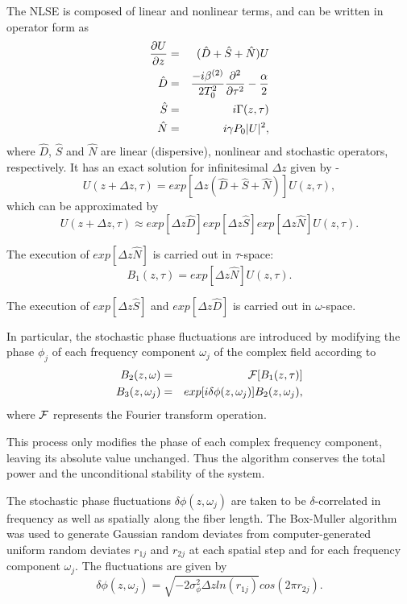 The NLSE is composed of linear and nonlinear terms, and can be written in operator form as
\begin{eqnarray}
{\partial U \over \partial z} & = & (\hat{D}+\hat{S}+\hat{N})U \nonumber \\
\hat{D}& = & {-i\beta^{(2)} \over 2T_0^2}
{\partial^2 \over \partial\tau^2} - {\alpha \over 2} \nonumber \\
\hat{S} & = & i\Gamma(z,\tau) \nonumber \\
\hat{N} & = & i\gamma P_0|U|^2,
\end{eqnarray}
where $\hat{D}$, $\hat{S}$ and $\hat{N}$ are linear
(dispersive), nonlinear 
and stochastic operators, respectively. It has an exact solution for 
infinitesimal $\Delta z$ given by - 
\begin{equation}
U(z + \Delta z,\tau) = exp[\Delta z(\hat{D} + \hat{S} + \hat{N})]U(z,\tau) ,
\end{equation}
which can be approximated by
\begin{equation}
U(z + \Delta z,\tau) \approx exp[\Delta z \hat{D}]exp[\Delta z \hat{S}]exp[\Delta z \hat{N}]U(z,\tau) .
\end{equation}

The execution of $exp[\Delta z \hat{N}]$ is carried out in $\tau$-space:
\begin{equation}
B_1(z,\tau)=exp[\Delta z \hat{N}]U(z,\tau) .
\end{equation}

The execution of $exp[\Delta z \hat{S}]$ and $exp[\Delta z \hat{D}]$ is 
carried out in $\omega$-space.

In particular, the stochastic phase fluctuations are introduced by modifying 
the phase $\phi_j$ of each frequency component $\omega_j$ of the complex 
field according to
\begin{eqnarray}
B_2(z,\omega) & = & {\cal{F}}[B_1(z,\tau)] \nonumber \\
B_3(z,\omega_{j}) & = & exp[i \delta\phi(z,\omega_j)]B_2(z,\omega_j) ,
\end{eqnarray}
where $\cal{F}$ represents the Fourier transform operation.

This process only modifies the phase of each complex frequency component, 
leaving its absolute value unchanged. Thus the algorithm conserves the total 
power and the unconditional stability of the system.

The stochastic phase fluctuations $\delta\phi(z,\omega_j)$ are taken to be 
$\delta$-correlated in frequency as well as spatially along the fiber length. 
The Box-Muller algorithm \cite{boxmuller} was used to generate Gaussian random
deviates from computer-generated uniform random deviates $r_{1j}$ and $r_{2j}$
at each spatial step and for each frequency component $\omega_j$. The 
fluctuations are given by
\begin{equation}
\delta\phi(z,\omega_{j}) = \sqrt{-2\sigma_{\phi}^2 \Delta z ln(r_{1j})}cos(2 \pi r_{2j}) .
\end{equation}

